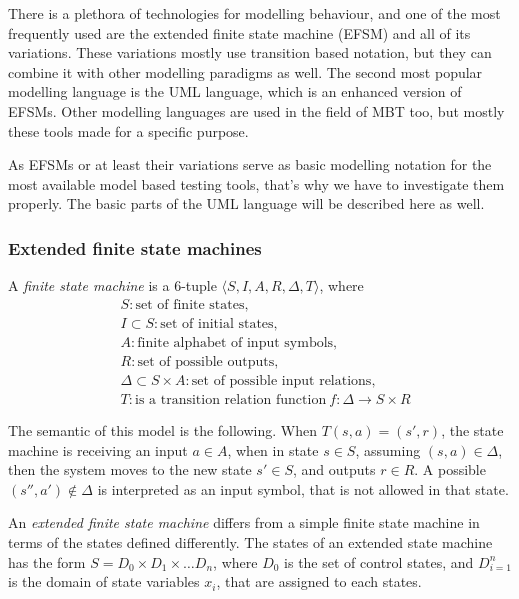 There is a plethora of technologies for modelling behaviour, and one of the most frequently used are the extended finite state machine (EFSM) and all of its variations. These variations mostly use transition based notation, but they can combine it with other modelling paradigms as well. The second most popular modelling language is the UML language, which is an enhanced version of EFSMs. Other modelling languages are used in the field of MBT too, but mostly these tools made for a specific purpose.

As EFSMs or at least their variations serve as basic modelling notation for the most available model based testing tools, that's why we have to investigate them properly. The basic parts of the UML language will be described here as well.

\subsubsection{Extended finite state machines}
\label{ssub:efsm}

A \textit{finite state machine} is a 6-tuple $\langle S, I, A, R, \Delta, T\rangle$, where
\begin{align*}
& S: \text{set of finite states},\\
& I \subset S: \text{set of initial states},\\
& A: \text{finite alphabet of input symbols},\\
& R: \text{set of possible outputs},\\
& \Delta \subset S \times A: \text{set of possible input relations},\\
& T: \text{is a transition relation function}\ f: \Delta \rightarrow S \times R
\end{align*}

The semantic of this model is the following. When $T(s, a) = (s', r)$, the state machine is receiving an input $a \in A$, when in state $s \in S$, assuming $(s,a) \in \Delta$, then the system moves to the new state $s' \in S$, and outputs $r \in R$. A possible $(s'', a') \notin \Delta$ is interpreted as an input symbol, that is not allowed in that state.

An \textit{extended finite state machine} differs from a simple finite state machine in terms of the states defined differently. The states of an extended state machine has the form $S = D_0 \times D_1 \times \dots D_n$, where $D_0$ is the set of control states, and $D_{i=1}^n$ is the domain of state variables $x_i$, that are assigned to each states.

